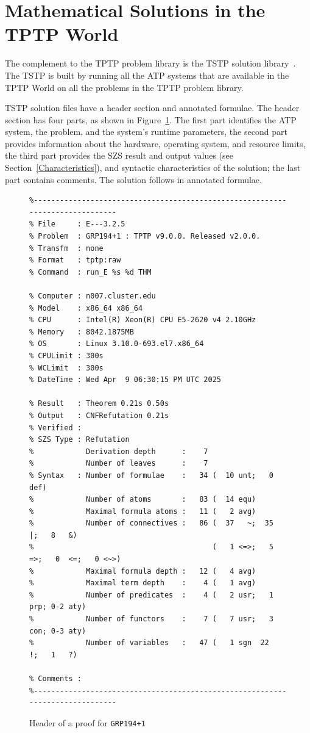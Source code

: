 \documentclass[runningheads]{llncs}
\begin{document}
\section{Mathematical Solutions in the TPTP World}
\label{TSTP}

The complement to the TPTP problem library is the TSTP solution library~\cite{Sut07-CSR,Sut10}.
The TSTP is built by running all the ATP systems that are available in the TPTP World on
all the problems in the TPTP problem library.

TSTP solution files have a header section and annotated formulae.
The header section has four parts, as shown in Figure~\ref{ExampleDerivationHeader}.
The first part identifies the ATP system, the problem, and the system's runtime parameters,
the second part provides information about the hardware, operating system, and resource limits,
the third part provides the SZS result and output values (see Section~\ref{Characteristics}), 
and syntactic characteristics of the solution; the last part contains comments.
The solution follows in annotated formulae.

\begin{figure}[htb]
\centering
{\scriptsize
{\setlength{\baselineskip}{2.5mm}
\begin{verbatim}
%------------------------------------------------------------------------------
% File     : E---3.2.5
% Problem  : GRP194+1 : TPTP v9.0.0. Released v2.0.0.
% Transfm  : none
% Format   : tptp:raw
% Command  : run_E %s %d THM

% Computer : n007.cluster.edu
% Model    : x86_64 x86_64
% CPU      : Intel(R) Xeon(R) CPU E5-2620 v4 2.10GHz
% Memory   : 8042.1875MB
% OS       : Linux 3.10.0-693.el7.x86_64
% CPULimit : 300s
% WCLimit  : 300s
% DateTime : Wed Apr  9 06:30:15 PM UTC 2025

% Result   : Theorem 0.21s 0.50s
% Output   : CNFRefutation 0.21s
% Verified : 
% SZS Type : Refutation
%            Derivation depth      :    7
%            Number of leaves      :    7
% Syntax   : Number of formulae    :   34 (  10 unt;   0 def)
%            Number of atoms       :   83 (  14 equ)
%            Maximal formula atoms :   11 (   2 avg)
%            Number of connectives :   86 (  37   ~;  35   |;   8   &)
%                                         (   1 <=>;   5  =>;   0  <=;   0 <~>)
%            Maximal formula depth :   12 (   4 avg)
%            Maximal term depth    :    4 (   1 avg)
%            Number of predicates  :    4 (   2 usr;   1 prp; 0-2 aty)
%            Number of functors    :    7 (   7 usr;   3 con; 0-3 aty)
%            Number of variables   :   47 (   1 sgn  22   !;   1   ?)

% Comments : 
%------------------------------------------------------------------------------
\end{verbatim}
}}
\caption{Header of a proof for {\tt GRP194+1}}
\label{ExampleDerivationHeader}
\end{figure}
\end{document}
